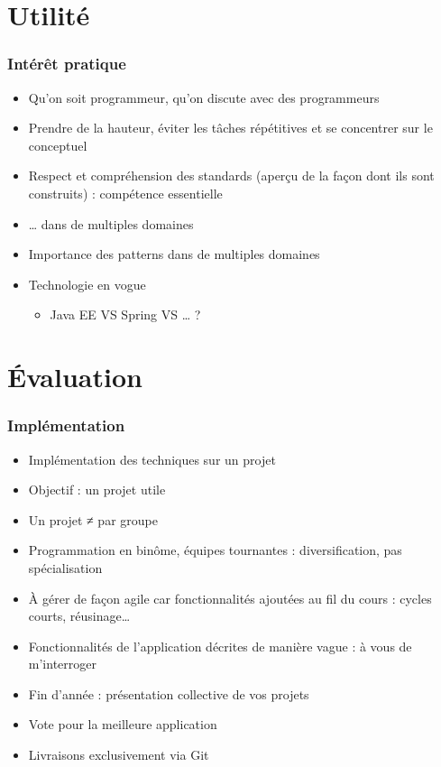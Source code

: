\documentclass[english, french]{beamer}
\begin{document}
\section{Utilité}
\begin{frame}
	\frametitle{Intérêt pratique}
	\begin{itemize}
		\item Qu’on soit programmeur, qu’on discute avec des programmeurs
		\item Prendre de la hauteur, éviter les tâches répétitives et se concentrer sur le conceptuel
		\item Respect et compréhension des standards (aperçu de la façon dont ils sont construits) : compétence essentielle
		\item … dans de multiples domaines
		\item Importance des patterns dans de multiples domaines
		\item Technologie en vogue
		\begin{itemize}
			\item Java EE VS Spring VS … ?
		\end{itemize}
	\end{itemize}
\end{frame}

\section{Évaluation}
\begin{frame}
	\frametitle{Implémentation}
	\begin{itemize}
		\item Implémentation des techniques sur un projet
		\item Objectif : un projet utile
		\item Un projet ≠ par groupe
		\item Programmation en binôme, équipes tournantes : diversification, pas spécialisation
		\item À gérer de façon agile car fonctionnalités ajoutées au fil du cours : cycles courts, réusinage…
		\item Fonctionnalités de l’application décrites de manière vague : à vous de m’interroger
		\item Fin d’année : présentation collective de vos projets
		\item Vote pour la meilleure application
		\item Livraisons exclusivement via Git
	\end{itemize}
\end{frame}
\end{document}
